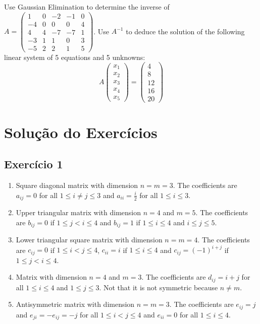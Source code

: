 Use Gaussian Elimination to determine the inverse of
$A = \begin{pmatrix}
  1 & 0 & -2 & -1 & 0   \\
  -4 & 0 & 0 & 0 & 4 \\
  4 & 4 & -7 & -7 & 1   \\
  -3 & 1 & 1 & 0 & 3  \\
  -5 & 2 & 2 & 1 & 5
\end{pmatrix}$.
Use $A^{-1}$ to deduce the solution of the following linear
system of 5 equations and 5 unknowns:
$$
A \begin{pmatrix} x_1 \\ x_2 \\ x_3 \\ x_4 \\ x_5 \end{pmatrix} =
\begin{pmatrix} 4 \\ 8 \\ 12 \\ 16 \\ 20 \end{pmatrix}
$$

\section{Solução do Exercícios}

\subsection*{Exercício 1}

\begin{enumerate}

\item Square diagonal matrix with dimension $n = m = 3$. The coefficients are
  $a_{ij} = 0$ for all $1 \leq i \neq j \leq 3$ and
  $a_{ii} = \frac{i}{2}$ for all $1 \leq i \leq 3$.

\item Upper triangular matrix with dimension $n = 4$ and $m=5$.
  The coefficients are
  $b_{ij} = 0$ if $1 \leq j < i \leq 4$ and
  $b_{ij} = 1$ if $1 \leq i \leq 4$ and $i \leq j \leq 5$.

\item Lower triangular square matrix with dimension $n = m = 4$.
  The coefficients are
  $c_{ij} = 0$ if $1 \leq i < j \leq 4$,
  $c_{ii} = i$ if $1 \leq i \leq 4$ and
  $c_{ij} = {(-1)}^{i+j}$ if $1 \leq j < i \leq 4$.

\item Matrix with dimension $n = 4$ and $m = 3$.
  The coefficients are
  $d_{ij} = i + j$ for all $1 \leq i \leq 4$ and $1 \leq j \leq 3$.
  Not that it is not symmetric because $n \neq m$.
\item Antisymmetric matrix with dimension $n = m = 3$.
  The coefficients are
  $e_{ij} = j$ and $e_{ji} = -e_{ij} = -j$
  for all $1 \leq i < j \leq 4$ and
  $e_{ii} = 0$ for all $1 \leq i \leq 4$.
\end{enumerate}

